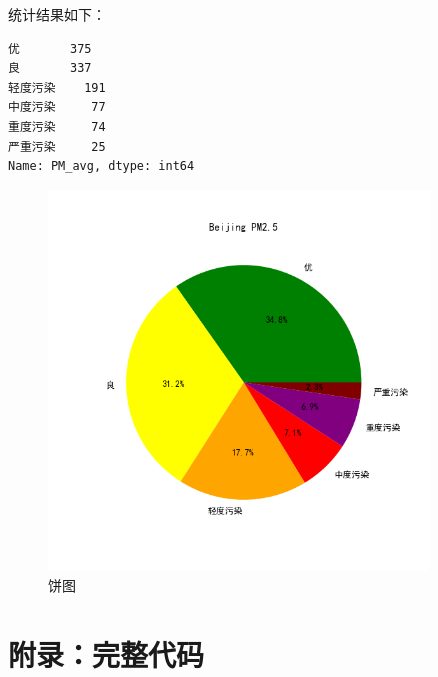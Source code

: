 \documentclass[lang=cn,11pt,a4paper]{elegantpaper}
\begin{document}
统计结果如下：
\begin{lstlisting}[language=text]
优       375
良       337
轻度污染    191
中度污染     77
重度污染     74
严重污染     25
Name: PM_avg, dtype: int64
\end{lstlisting}

\begin{figure}[H]
    \centering
    \includegraphics[width=0.9\textwidth]{image/pie.png}
    \caption{饼图}
\end{figure}


\section{附录：完整代码}
\end{document}

